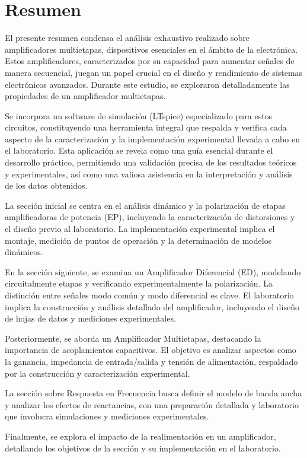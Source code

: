 
\section{Resumen}

El presente resumen condensa el análisis exhaustivo realizado sobre amplificadores multietapas, dispositivos esenciales en el ámbito de la electrónica. Estos amplificadores, caracterizados por su capacidad para aumentar señales de manera secuencial, juegan un papel crucial en el diseño y rendimiento de sistemas electrónicos avanzados. Durante este estudio, se exploraron detalladamente las propiedades de un amplificador multietapas. 

Se incorpora un software de simulación (LTspice) especializado para estos circuitos, constituyendo una herramienta integral que respalda y verifica cada aspecto de la caracterización y la implementación experimental llevada a cabo en el laboratorio. Esta aplicación se revela como una guía esencial durante el desarrollo práctico, permitiendo una validación precisa de los resultados teóricos y experimentales, así como una valiosa asistencia en la interpretación y análisis de los datos obtenidos.

 La sección inicial se centra en el análisis dinámico y la polarización de etapas amplificadoras de potencia (EP), incluyendo la caracterización de distorsiones y el diseño previo al laboratorio. La implementación experimental implica el montaje, medición de puntos de operación y la determinación de modelos dinámicos. 

En la sección siguiente, se examina un Amplificador Diferencial (ED), modelando circuitalmente etapas y verificando experimentalmente la polarización. La distinción entre señales modo común y modo diferencial es clave. El laboratorio implica la construcción y análisis detallado del amplificador, incluyendo el diseño de hojas de datos y mediciones experimentales. 

Posteriormente, se aborda un Amplificador Multietapas, destacando la importancia de acoplamientos capacitivos. El objetivo es analizar aspectos como la ganancia, impedancia de entrada/salida y tensión de alimentación, respaldado por la construcción y caracterización experimental. 

La sección sobre Respuesta en Frecuencia busca definir el modelo de banda ancha y analizar los efectos de reactancias, con una preparación detallada y laboratorio que involucra simulaciones y mediciones experimentales. 

Finalmente, se explora el impacto de la realimentación en un amplificador, detallando los objetivos de la sección y su implementación en el laboratorio. 

\newpage